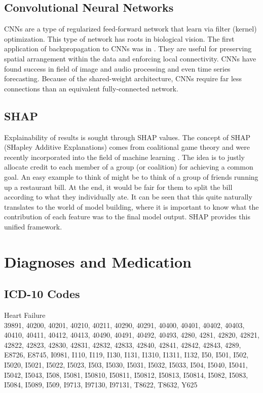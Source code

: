 \documentclass[%
 twocolumn,
 reprint,
 amsmath,amssymb,
 aps,nofootinbib
]{revtex4-2}
\begin{document}
\subsection{\label{app:conv}Convolutional Neural Networks}
CNNs are a type of regularized feed-forward network that learn via filter (kernel) optimization. This type of network has roots in biological vision. The first application of backpropagation to CNNs was in \cite{cnn}. They are useful for preserving spatial arrangement within the data and enforcing local connectivity. CNNs have found success in field of image and audio processing and even time series forecasting. Because of the shared-weight architecture, CNNs require far less connections than an equivalent fully-connected network.

\subsection{\label{app:SHAP}SHAP}
Explainability of results is sought through SHAP values. The concept of SHAP (SHapley Additive Explanations) comes from coalitional game theory and were recently incorporated into the field of machine learning \cite{shap_force_plot} \cite{shap}. The idea is to justly allocate credit to each member of a group (or coalition) for achieving a common goal. An easy example to think of might be to think of a group of friends running up a restaurant bill. At the end, it would be fair for them to split the bill according to what they individually ate. It can be seen that this quite naturally translates to the world of model building, where it is important to know what the contribution of each feature was to the final model output. SHAP provides this unified framework.\\


\section{\label{appdx3}Diagnoses and Medication}

\subsection{\label{app:diag_codes}ICD-10 Codes}

Heart Failure \\

39891, 40200, 40201, 40210, 40211, 40290, 40291, 40400, 40401, 40402, 40403, 40410, 40411, 40412, 40413, 40490, 40491, 40492, 40493, 4280, 4281, 42820, 42821, 42822, 42823, 42830, 42831, 42832, 42833, 42840, 42841, 42842, 42843, 4289, E8726, E8745, I0981, I110, I119, I130, I131, I1310, I1311, I132, I50, I501, I502, I5020, I5021, I5022, I5023, I503, I5030, I5031, I5032, I5033, I504, I5040, I5041, I5042, I5043, I508, I5081, I50810, I50811, I50812, I50813, I50814, I5082, I5083, I5084, I5089, I509, I9713, I97130, I97131, T8622, T8632, Y625\\
\end{document}
